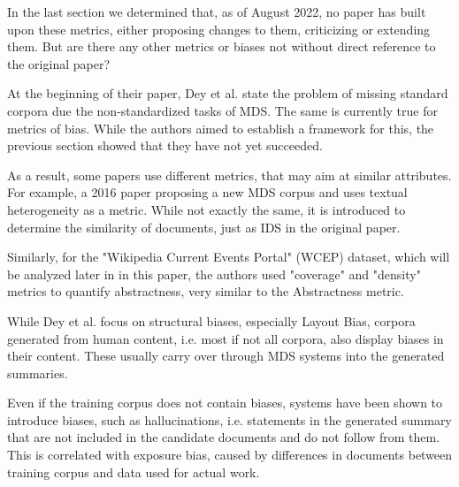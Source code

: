 \documentclass[../main.tex]{subfiles}
\begin{document}
In the last section we determined that, as of August 2022, no paper has built upon these metrics, either proposing changes to them, criticizing or extending them.
But are there any other metrics or biases not without direct reference to the original paper?

At the beginning of their paper, Dey et al. state the problem of missing standard corpora due the non-standardized tasks of MDS.
The same is currently true for metrics of bias.
While the authors aimed to establish a framework for this, the previous section showed that they have not yet succeeded.

As a result, some papers use different metrics, that may aim at similar attributes. For example, a 2016 paper proposing a new MDS corpus and uses textual heterogeneity as a metric. \cite{zopf_maxime_peyrard_eckle-kohler_2016}
While not exactly the same, it is introduced to determine the similarity of documents, just as IDS in the original paper.

Similarly, for the "Wikipedia Current Events Portal" (WCEP) dataset,
which will be analyzed later in in this paper, the authors used "coverage" and "density" metrics to quantify abstractness,
very similar to the Abstractness metric.\cite{WCEP-gholipour-ghalandari-etal-2020-large}


While Dey et al. focus on structural biases, especially Layout Bias, corpora generated from human content, i.e. most if not all corpora, also display biases in their content. These usually carry over through MDS systems into the generated summaries. \cite{nadeem-etal-2021-stereoset}

Even if the training corpus does not contain biases, systems have been shown to introduce biases, such as hallucinations, i.e. statements in the generated summary that are not included in the candidate documents and do not follow from them. This is correlated with exposure bias, caused by differences in documents between training corpus and data used for actual work. \cite{Exposure_bias_wang_sennrich_2020}



\end{document}
